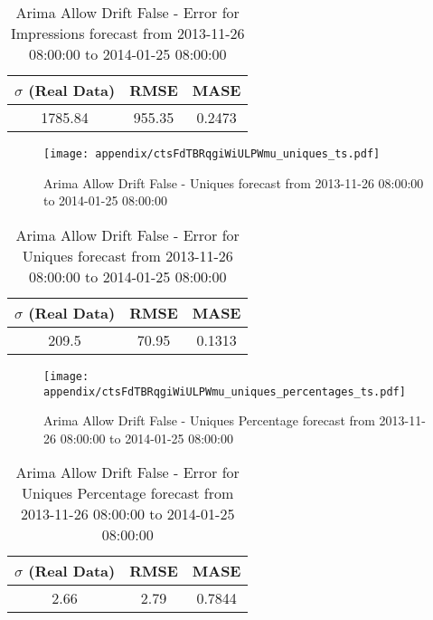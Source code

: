 \begin{table}[H]
\centering
\footnotesize
\begin{tabular}{ccc}
$\sigma$ (Real Data) & RMSE & MASE   \\ \hline
1785.84 & 955.35 & 0.2473 \\
\end{tabular}

\vspace{0.5cm}

\caption{
Arima Allow Drift False - Error for Impressions forecast from 2013-11-26 08:00:00 to 2014-01-25 08:00:00}
\end{table}

\begin{figure}[H] \begin{center} \leavevmode
\texttt{[image: appendix/ctsFdTBRqgiWiULPWmu\_uniques\_ts.pdf]} \caption{
Arima Allow Drift False - Uniques forecast from 2013-11-26 08:00:00 to 2014-01-25 08:00:00} \label{fig:appendix/ctsFdTBRqgiWiULPWmu_uniques_ts.pdf} \end{center}
\end{figure}

\begin{table}[H]
\centering
\footnotesize
\begin{tabular}{ccc}
$\sigma$ (Real Data) & RMSE & MASE   \\ \hline
209.5 & 70.95 & 0.1313 \\
\end{tabular}

\vspace{0.5cm}

\caption{
Arima Allow Drift False - Error for Uniques forecast from 2013-11-26 08:00:00 to 2014-01-25 08:00:00}
\end{table}

\begin{figure}[H] \begin{center} \leavevmode
\texttt{[image: appendix/ctsFdTBRqgiWiULPWmu\_uniques\_percentages\_ts.pdf]} \caption{
Arima Allow Drift False - Uniques Percentage forecast from 2013-11-26 08:00:00 to 2014-01-25 08:00:00} \label{fig:appendix/ctsFdTBRqgiWiULPWmu_uniques_percentages_ts.pdf} \end{center}
\end{figure}

\begin{table}[H]
\centering
\footnotesize
\begin{tabular}{ccc}
$\sigma$ (Real Data) & RMSE & MASE   \\ \hline
2.66 & 2.79 & 0.7844 \\
\end{tabular}

\vspace{0.5cm}

\caption{
Arima Allow Drift False - Error for Uniques Percentage forecast from 2013-11-26 08:00:00 to 2014-01-25 08:00:00}
\end{table}


